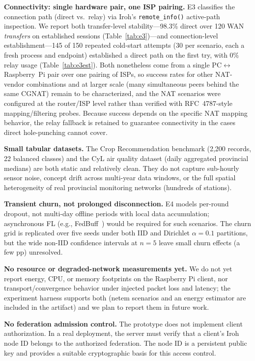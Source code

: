 ﻿\documentclass[journal]{IEEEtran}
\begin{document}
\textbf{Connectivity: single hardware pair, one ISP pairing.} E3 classifies the connection path (direct vs.~relay) via Iroh's \texttt{remote\_info()} active-path inspection. We report both transfer-level stability---98.3\% direct over 120 WAN \emph{transfers} on established sessions (Table~\ref{tab:e3})---and connection-level establishment---145 of 150 repeated cold-start attempts (30 per scenario, each a fresh process and endpoint) established a direct path on the first try, with 0\% relay usage (Table~\ref{tab:e3est}). Both nonetheless come from a single PC$\leftrightarrow$Raspberry~Pi pair over one pairing of ISPs, so success rates for other NAT-vendor combinations and at larger scale (many simultaneous peers behind the same CGNAT) remain to be characterized, and the NAT scenarios were configured at the router/ISP level rather than verified with RFC~4787-style mapping/filtering probes. Because success depends on the specific NAT mapping behavior, the relay fallback is retained to guarantee connectivity in the cases direct hole-punching cannot cover.

\textbf{Small tabular datasets.} The Crop Recommendation benchmark (2,200 records, 22 balanced classes) and the CyL air quality dataset (daily aggregated provincial medians) are both static and relatively clean. They do not capture sub-hourly sensor noise, concept drift across multi-year data windows, or the full spatial heterogeneity of real provincial monitoring networks (hundreds of stations).

\textbf{Transient churn, not prolonged disconnection.} E4 models per-round dropout, not multi-day offline periods with local data accumulation; asynchronous FL (e.g., FedBuff~\cite{fedbuff2022}) would be required for such scenarios. The churn grid is replicated over five seeds under both IID and Dirichlet $\alpha{=}0.1$ partitions, but the wide non-IID confidence intervals at $n{=}5$ leave small churn effects (a few pp) unresolved.

\textbf{No resource or degraded-network measurements yet.} We do not yet report energy, CPU, or memory footprints on the Raspberry Pi client, nor transport/convergence behavior under injected packet loss and latency; the experiment harness supports both (netem scenarios and an energy estimator are included in the artifact) and we plan to report them in future work.

\textbf{No federation admission control.} The prototype does not implement client authorization. In a real deployment, the server must verify that a client's Iroh node ID belongs to the authorized federation. The node ID is a persistent public key and provides a suitable cryptographic basis for this access control.
\end{document}
